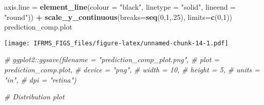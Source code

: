 \documentclass[
]{article}
\newenvironment{Shaded}{\begin{snugshade}}{\end{snugshade}}
\newcommand{\CommentTok}[1]{\textcolor[rgb]{0.56,0.35,0.01}{\textit{#1}}}
\newcommand{\DataTypeTok}[1]{\textcolor[rgb]{0.13,0.29,0.53}{#1}}
\newcommand{\DecValTok}[1]{\textcolor[rgb]{0.00,0.00,0.81}{#1}}
\newcommand{\KeywordTok}[1]{\textcolor[rgb]{0.13,0.29,0.53}{\textbf{#1}}}
\newcommand{\NormalTok}[1]{#1}
\newcommand{\OperatorTok}[1]{\textcolor[rgb]{0.81,0.36,0.00}{\textbf{#1}}}
\newcommand{\StringTok}[1]{\textcolor[rgb]{0.31,0.60,0.02}{#1}}
\begin{document}
\begin{Shaded}
\begin{Highlighting}[]
        \DataTypeTok{axis.line =} \KeywordTok{element_line}\NormalTok{(}\DataTypeTok{colour =} \StringTok{"black"}\NormalTok{, }\DataTypeTok{linetype =} \StringTok{"solid"}\NormalTok{, }\DataTypeTok{lineend =} \StringTok{"round"}\NormalTok{)) }\OperatorTok{+}
\StringTok{  }\KeywordTok{scale_y_continuous}\NormalTok{(}\DataTypeTok{breaks=}\KeywordTok{seq}\NormalTok{(}\DecValTok{0}\NormalTok{,}\DecValTok{1}\NormalTok{,.}\DecValTok{25}\NormalTok{), }\DataTypeTok{limits=}\KeywordTok{c}\NormalTok{(}\DecValTok{0}\NormalTok{,}\DecValTok{1}\NormalTok{))}
\NormalTok{prediction_comp.plot}
\end{Highlighting}
\end{Shaded}

\texttt{[image: IFRMS\_FIGS\_files/figure-latex/unnamed-chunk-14-1.pdf]}

\begin{Shaded}
\begin{Highlighting}[]
\CommentTok{# ggplot2::ggsave(filename = "prediction_comp_plot.png",}
\CommentTok{#                 plot = prediction_comp.plot,}
\CommentTok{#                 device = "png",}
\CommentTok{#                 width = 10,}
\CommentTok{#                 height = 5, }
\CommentTok{#                 units = "in",}
\CommentTok{#                 dpi = "retina")}


\CommentTok{# Distribution plot}


\end{Highlighting}
\end{Shaded}
\end{document}
